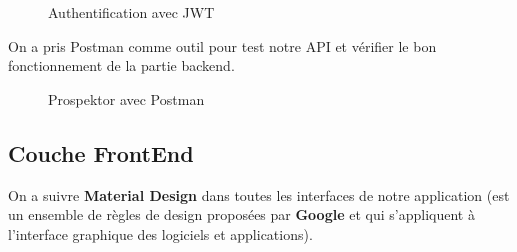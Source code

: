 \begin{figure}[H]
	\caption{\label{fig:my-label} Authentification avec JWT}
\end{figure}

On a pris Postman comme outil pour test notre \gls{API} et v\'erifier le bon fonctionnement de la partie backend.

\begin{figure}[H]
	\caption{\label{fig:my-label} Prospektor avec Postman}
\end{figure}

\subsection{Couche FrontEnd}

On a suivre \textbf{Material Design} dans toutes les interfaces de notre application (est un ensemble de r\`egles de design propos\'ees par \textbf{Google} et qui s'appliquent \`a l'interface graphique des logiciels et applications).

